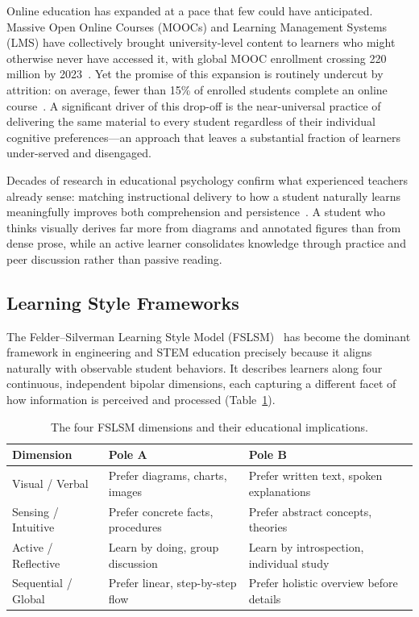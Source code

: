 \documentclass[journal, onecolumn]{IEEEtran}
\begin{document}
Online education has expanded at a pace that few could have anticipated. Massive Open Online Courses (MOOCs) and Learning Management Systems (LMS) have collectively brought university-level content to learners who might otherwise never have accessed it, with global MOOC enrollment crossing 220 million by 2023~\cite{shah2023mooc}. Yet the promise of this expansion is routinely undercut by attrition: on average, fewer than 15\% of enrolled students complete an online course~\cite{khalil2014mooc}. A significant driver of this drop-off is the near-universal practice of delivering the same material to every student regardless of their individual cognitive preferences---an approach that leaves a substantial fraction of learners under-served and disengaged.

Decades of research in educational psychology confirm what experienced teachers already sense: matching instructional delivery to how a student naturally learns meaningfully improves both comprehension and persistence~\cite{felder1988learning}. A student who thinks visually derives far more from diagrams and annotated figures than from dense prose, while an active learner consolidates knowledge through practice and peer discussion rather than passive reading.

\subsection{Learning Style Frameworks}

The Felder--Silverman Learning Style Model (FSLSM)~\cite{felder1988learning} has become the dominant framework in engineering and STEM education precisely because it aligns naturally with observable student behaviors. It describes learners along four continuous, independent bipolar dimensions, each capturing a different facet of how information is perceived and processed (Table~\ref{tab:fslsm_dims}).

\begin{table}[!htbp]
\centering
\small
\caption{The four FSLSM dimensions and their educational implications.}
\label{tab:fslsm_dims}
\begin{tabular}{@{}p{3.2cm}p{5.5cm}p{5.5cm}@{}}
\toprule
\textbf{Dimension} & \textbf{Pole A} & \textbf{Pole B} \\
\midrule
Visual / Verbal & Prefer diagrams, charts, images & Prefer written text, spoken explanations \\
Sensing / Intuitive & Prefer concrete facts, procedures & Prefer abstract concepts, theories \\
Active / Reflective & Learn by doing, group discussion & Learn by introspection, individual study \\
Sequential / Global & Prefer linear, step-by-step flow & Prefer holistic overview before details \\
\bottomrule
\end{tabular}
\end{table}
\end{document}
